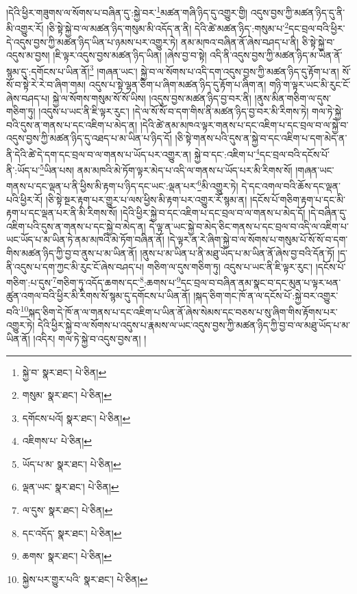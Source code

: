 །དེའི་ཕྱིར་གཟུགས་ལ་སོགས་པ་བཞིན་དུ་:སྐྱེ་བར་\footnote{སྐྱེ་བ་  སྣར་ཐང་།  པེ་ཅིན། }མཚན་གཞི་ཉིད་དུ་འགྱུར་གྱི། འདུས་བྱས་ཀྱི་མཚན་ཉིད་དུ་ནི་མི་འགྱུར་རོ། །ཅི་སྟེ་སྐྱེ་བ་ལ་མཚན་ཉིད་གསུམ་མི་འདོད་ན་ནི། དེའི་ཚེ་མཚན་ཉིད་:གསུམ་པ་\footnote{གསུམ་  སྣར་ཐང་།  པེ་ཅིན། }དང་བྲལ་བའི་ཕྱིར་དེ་འདུས་བྱས་ཀྱི་མཚན་ཉིད་ཡིན་པ་ཉམས་པར་འགྱུར་ཏེ། ནམ་མཁའ་བཞིན་ནོ་ཞེས་བཤད་པ་ནི། ཅི་སྟེ་སྐྱེ་བ་འདུས་མ་བྱས། །ཇི་ལྟར་འདུས་བྱས་མཚན་ཉིད་ཡིན། །ཞེས་བྱ་བ་སྟེ། འདི་ནི་འདུས་བྱས་ཀྱི་མཚན་ཉིད་མ་ཡིན་ནོ་སྙམ་དུ་:དགོངས་པ་ཡིན་ནོ།\footnote{དགོངས་པའོ།  སྣར་ཐང་།  པེ་ཅིན། } །གཞན་ཡང་། སྐྱེ་བ་ལ་སོགས་པ་འདི་དག་འདུས་བྱས་ཀྱི་མཚན་ཉིད་དུ་རྟོག་པ་ན། སོ་སོ་བ་སྟེ་རེ་རེ་བ་ཞིག་གམ། འདུས་པ་སྟེ་ལྷན་ཅིག་པ་ཞིག་མཚན་ཉིད་དུ་རྟོག་པ་ཞིག་ན། གཉི་ག་ལྟར་ཡང་མི་རུང་ངོ་ཞེས་བཤད་པ། སྐྱེ་ལ་སོགས་གསུམ་སོ་སོ་ཡིས། །འདུས་བྱས་མཚན་ཉིད་བྱ་བར་ནི། །ནུས་མིན་གཅིག་ལ་དུས་གཅིག་ཏུ། །འདུས་པ་ཡང་ནི་ཇི་ལྟར་རུང་། །དེ་ལ་སོ་སོ་བ་དག་གིས་ནི་མཚན་ཉིད་བྱ་བར་མི་རིགས་ཏེ། གལ་ཏེ་སྐྱེ་བའི་དུས་ན་གནས་པ་དང་འཇིག་པ་མེད་ན། །དེའི་ཚེ་ནམ་མཁའ་ལྟར་གནས་པ་དང་འཇིག་པ་དང་བྲལ་བ་ལ་སྐྱེ་བ་འདུས་བྱས་ཀྱི་མཚན་ཉིད་དུ་འཐད་པ་མ་ཡིན་པ་ཉིད་དོ། །ཅི་སྟེ་གནས་པའི་དུས་ན་སྐྱེ་བ་དང་འཇིག་པ་དག་མེད་ན་ནི་དེའི་ཚེ་དེ་དག་དང་བྲལ་བ་ལ་གནས་པ་ཡོད་པར་འགྱུར་ན། སྐྱེ་བ་དང་:འཇིག་པ་\footnote{འཇིགས་པ་  པེ་ཅིན། }དང་བྲལ་བའི་དངོས་པོ་ནི་:ཡོད་པ་\footnote{ཡོད་པ་མ་  སྣར་ཐང་།  པེ་ཅིན། }ཡིན་པས། ནམ་མཁའི་མེ་ཏོག་ལྟར་མེད་པ་འདི་ལ་གནས་པ་ཡོད་པར་མི་རིགས་སོ། །གཞན་ཡང་གནས་པ་དང་ལྡན་པ་ནི་ཕྱིས་མི་རྟག་པ་ཉིད་དང་ཡང་:ལྡན་པར་\footnote{ལྡན་ཡང་  སྣར་ཐང་།  པེ་ཅིན། }མི་འགྱུར་ཏེ། དེ་དང་འགལ་བའི་ཆོས་དང་ལྡན་པའི་ཕྱིར་རོ། །ཅི་སྟེ་སྔར་རྟག་པར་གྱུར་པ་ལས་ཕྱིས་མི་རྟག་པར་འགྱུར་རོ་སྙམ་ན། །དངོས་པོ་གཅིག་རྟག་པ་དང་མི་རྟག་པ་དང་ལྡན་པར་ནི་མི་རིགས་སོ། །དེའི་ཕྱིར་སྐྱེ་བ་དང་འཇིག་པ་དང་བྲལ་བ་ལ་གནས་པ་མེད་དོ། །དེ་བཞིན་དུ་འཇིག་པའི་དུས་ན་གནས་པ་དང་སྐྱེ་བ་མེད་ན། དེ་ལྟ་ན་ཡང་སྐྱེ་བ་མེད་ཅིང་གནས་པ་དང་བྲལ་བ་འདི་ལ་འཇིག་པ་ཡང་ཡོད་པ་མ་ཡིན་ཏེ་ནམ་མཁའི་མེ་ཏོག་བཞིན་ནོ། །དེ་ལྟར་ན་རེ་ཞིག་སྐྱེ་བ་ལ་སོགས་པ་གསུམ་པོ་སོ་སོ་བ་དག་གིས་མཚན་ཉིད་ཀྱི་བྱ་བ་ནུས་པ་མ་ཡིན་ནོ། །ནུས་པ་མ་ཡིན་པ་ནི་མཐུ་ཡོད་པ་མ་ཡིན་ནོ་ཞེས་བྱ་བའི་དོན་ཏོ། །ད་ནི་འདུས་པ་དག་ཀྱང་མི་རུང་ངོ་ཞེས་བཤད་པ། གཅིག་ལ་དུས་གཅིག་ཏུ། འདུས་པ་ཡང་ནི་ཇི་ལྟར་རུང་། །དངོས་པོ་གཅིག་:པ་དུས་\footnote{ལ་དུས་  སྣར་ཐང་།  པེ་ཅིན། }གཅིག་ཏུ་འདོད་ཆགས་དང་\footnote{དང་འདོད་  སྣར་ཐང་།  པེ་ཅིན། }:ཆགས་པ་\footnote{ཆགས་  སྣར་ཐང་།  པེ་ཅིན། }དང་བྲལ་བ་བཞིན་ནམ་སྣང་བ་དང་མུན་པ་ལྟར་ཕན་ཚུན་འགལ་བའི་ཕྱིར་མི་རིགས་སོ་སྙམ་དུ་དགོངས་པ་ཡིན་ནོ། །སྐད་ཅིག་གང་ཁོ་ན་ལ་དངོས་པོ་:སྐྱེ་བར་འགྱུར་བའི་\footnote{སྐྱེས་པར་གྱུར་པའི་  སྣར་ཐང་།  པེ་ཅིན། }སྐད་ཅིག་དེ་ཁོ་ན་ལ་གནས་པ་དང་འཇིག་པ་ཡིན་ནོ་ཞེས་སེམས་དང་བཅས་པ་སུ་ཞིག་གིས་རྟོགས་པར་འགྱུར་ཏེ། དེའི་ཕྱིར་སྐྱེ་བ་ལ་སོགས་པ་འདུས་པ་རྣམས་ལ་ཡང་འདུས་བྱས་ཀྱི་མཚན་ཉིད་ཀྱི་བྱ་བ་ལ་མཐུ་ཡོད་པ་མ་ཡིན་ནོ། །འདིར། གལ་ཏེ་སྐྱེ་བ་འདུས་བྱས་ན། །
